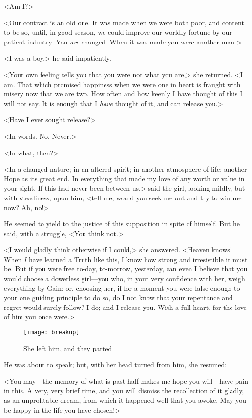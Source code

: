 <Am I\@?>

<Our contract is an old one. It was made when we were both poor, and content to be so, until, in good season, we could improve our worldly fortune by our patient industry. You \textit{are} changed. When it was made you were another man.>

<I was a boy,> he said impatiently.

<Your own feeling tells you that you were not what you are,> she returned. <I am. That which promised happiness when we were one in heart is fraught with misery now that we are two. How often and how keenly I have thought of this I will not say. It is enough that I \textit{have} thought of it, and can release you.>

<Have I ever sought release?>

<In words. No. Never.>

<In what, then?>

<In a changed nature; in an altered spirit; in another atmosphere of life; another Hope as its great end. In everything that made my love of any worth or value in your sight. If this had never been between us,> said the girl, looking mildly, but with steadiness, upon him; <tell me, would you seek me out and try to win me now? Ah, no!>

He seemed to yield to the justice of this supposition in spite of himself. But he said, with a struggle, <You think not.>

<I would gladly think otherwise if I could,> she answered. <Heav\-en knows! When \textit{I} have learned a Truth like this, I know how strong and irresistible it must be. But if you were free to-day, to-morrow, yesterday, can even I believe that you would choose a dowerless girl—you who, in your very confidence with her, weigh everything by Gain: or, choosing her, if for a moment you were false enough to your one guiding principle to do so, do I not know that your repentance and regret would surely follow? I do; and I release you. With a full heart, for the love of him you once were.>

\begin{figure}[tb]
\centering
\texttt{[image: breakup]}
\caption{She left him, and they parted}
\end{figure}

He was about to speak; but, with her head turned from him, she resumed:

<You may—the memory of what is past half makes me hope you will—have pain in this. A very, very brief time, and you will dismiss the recollection of it gladly, as an unprofitable dream, from which it happened well that you awoke. May you be happy in the life you have chosen!>


